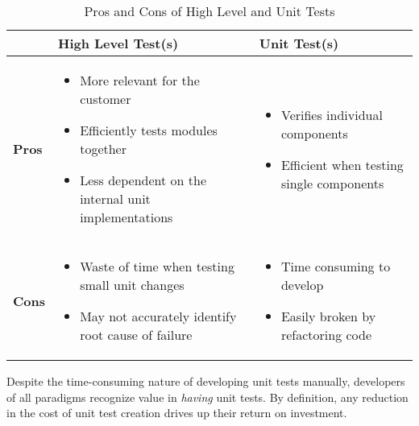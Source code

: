 \begin{table}[htbp]
    \caption{Pros and Cons of High Level and Unit Tests}
    \begin{center}
    \begin{tabular}{|>{\centering\arraybackslash}m{0.6cm}|>{\centering\arraybackslash}m{3.4cm}|>{\centering\arraybackslash}m{3.4cm}|}
        \hline
        \multirow{2}{*}{} & \textbf{High Level Test(s)} & \textbf{Unit Test(s)} \\
        \hline
        \textbf{Pros} & \begin{itemize}[leftmargin=*]
            \item More relevant for the customer
            \item Efficiently tests modules together
            \item Less dependent on the internal unit implementations
        \end{itemize} & \begin{itemize}[leftmargin=*]
            \item Verifies individual components
            \item Efficient when testing single components
        \end{itemize} \\
        \hline
        \textbf{Cons} & \begin{itemize}[leftmargin=*]
            \item Waste of time when testing small unit changes
            \item May not accurately identify root cause of failure
        \end{itemize} & \begin{itemize}[leftmargin=*]
            \item Time consuming to develop
            \item Easily broken by refactoring code
        \end{itemize} \\
        \hline
    \end{tabular}
    \label{tab1}
    \end{center}
\end{table}

Despite the time-consuming nature of developing unit tests manually, developers of all paradigms
recognize value in \textit{having} unit tests. By definition, any reduction in the cost of unit test creation drives 
up their return on investment.

